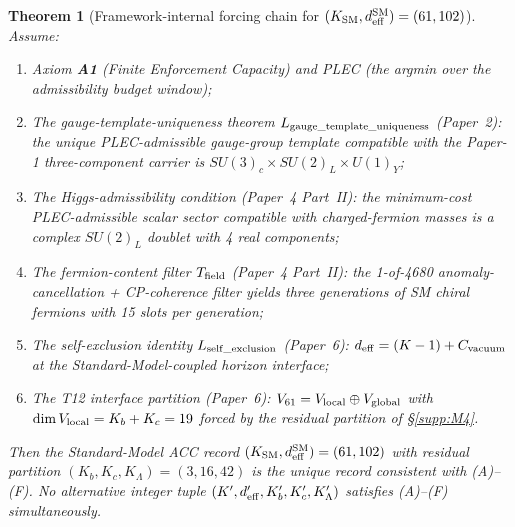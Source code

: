 \documentclass[11pt]{article}
\theoremstyle{plain}
\newtheorem{theorem}{Theorem}[section]
\theoremstyle{definition}
\theoremstyle{remark}
\newcommand{\Aone}{\textbf{A1}}
\begin{document}
\begin{theorem}[Framework-internal forcing chain for $(K_{\rm SM}, d_{\rm eff}^{\rm SM}) = (61, 102)$]\label{prop:ab_initio_forcing}
Assume:
\begin{enumerate}[leftmargin=2.5em,label=\textup{(\Alph*)},itemsep=3pt]
  \item Axiom \Aone{} (Finite Enforcement Capacity) and PLEC (the argmin over the admissibility budget window);
  \item The gauge-template-uniqueness theorem $L_{\rm gauge\_template\_uniqueness}$ (Paper~2): the unique PLEC-admissible gauge-group template compatible with the Paper-1 three-component carrier is $SU(3)_c \times SU(2)_L \times U(1)_Y$;
  \item The Higgs-admissibility condition (Paper~4 Part~II): the minimum-cost PLEC-admissible scalar sector compatible with charged-fermion masses is a complex $SU(2)_L$ doublet with 4 real components;
  \item The fermion-content filter $T_{\rm field}$ (Paper~4 Part~II): the 1-of-4680 anomaly-cancellation + CP-coherence filter yields three generations of SM chiral fermions with 15 slots per generation;
  \item The self-exclusion identity $L_{\rm self\_exclusion}$ (Paper~6): $d_{\rm eff} = (K - 1) + C_{\rm vacuum}$ at the Standard-Model-coupled horizon interface;
  \item The T12 interface partition (Paper~6): $V_{61} = V_{\rm local} \oplus V_{\rm global}$ with $\dim V_{\rm local} = K_b + K_c = 19$ forced by the residual partition of \S\ref{supp:M4}.
\end{enumerate}
Then the Standard-Model ACC record $(K_{\rm SM}, d_{\rm eff}^{\rm SM}) = (61, 102)$ with residual partition $(K_b, K_c, K_\Lambda) = (3, 16, 42)$ is the unique record consistent with (A)--(F).  No alternative integer tuple $(K', d_{\rm eff}', K_b', K_c', K_\Lambda')$ satisfies (A)--(F) simultaneously.
\end{theorem}
\end{document}
